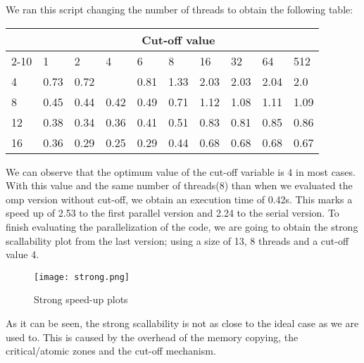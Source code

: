 \clearpage
\justify
We ran this script changing the number of threads to obtain the following table:
\begin{table}[!h]
\begin{tabular}{|l|l|l|l|l|l|l|l|l|l|}
\hline
 & \multicolumn{9}{c|}{Cut-off value} \\ \cline{2-10} 
\multirow{\#Threads} & 1 & 2 & 4 & 6 & 8 & 16 & 32 & 64 & 512 \\ \hline
4 & 0.73 & 0.72 & \cellcolor[HTML]{C0C0C0}{\color[HTML]{333333} 0.71} & 0.81 & 1.33 & 2.03 & 2.03 & 2.04 & 2.0 \\ \hline
8 & 0.45 & 0.44 & \cellcolor[HTML]{C0C0C0}0.42 & 0.49 & 0.71 & 1.12 & 1.08 & 1.11 & 1.09 \\ \hline
12 & 0.38 & \cellcolor[HTML]{C0C0C0}0.34 & 0.36 & 0.41 & 0.51 & 0.83 & 0.81 & 0.85 & 0.86 \\ \hline
16 & 0.36 & 0.29 & \cellcolor[HTML]{C0C0C0}0.25 & 0.29 & 0.44 & 0.68 & 0.68 & 0.68 & 0.67 \\ \hline
\end{tabular}
\end{table}

\justify
We can observe that the optimum value of the cut-off variable is 4 in most cases. With this value and the same number of threads(8) than when we evaluated the omp version without cut-off, we obtain an execution time of 0.42s. This marks a speed up of 2.53 to the first parallel version and 2.24 to the serial version.
\justify
To finish evaluating the parallelization of the code, we are going to obtain the strong scallability plot from the last version; using a size of 13, 8 threads and a cut-off value 4.

\begin{figure}[!h]
    \centering
    \texttt{[image: strong.png]}
    \caption{Strong speed-up plots}
    \label{fig:strong}
\end{figure}


\justify 
As it can be seen, the strong scallability is not as close to the ideal case as we are used to. This is caused by the overhead of the memory copying, the critical/atomic zones and the cut-off mechanism.

